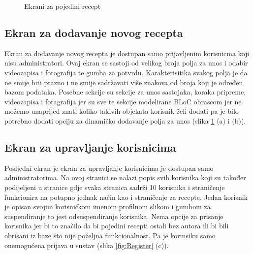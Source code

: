 \documentclass[times, utf8, zavrsni]{fer}
\begin{document}
\begin{figure}[h]
      \caption{Ekrani za pojedini recept}
      \label{fig:Single recipe}
\end{figure}

\subsection{Ekran za dodavanje novog recepta}
Ekran za dodavanje novog recepta je dostupan samo prijavljenim korisnicma koji nisu administratori.
Ovaj ekran se sastoji od velikog broja polja za unos i odabir videozapisa i fotografija te gumba za potvrdu.
Karakterisitika svakog polja je da ne smije biti prazno i ne smije sadržavati više znakova od broja koji
je određen bazom podataka. Posebne sekcije su sekcije za unos sastojaka, koraka pripreme, videozapisa i
fotagrafija jer su sve te sekcije modelirane BLoC obrascom jer ne možemo unaprijed znati koliko
takivih objekata korisnik želi dodati pa je bilo potrebno dodati opciju za dinamičko dodavanje
polja za unos (slika \ref{fig:Single recipe} (a) i (b)).

\subsection{Ekran za upravljanje korisnicima}
Posljedni ekran je ekran za upravljanje korisnicima je dostupan samo administratorima. Na ovoj stranici se
nalazi popis svih korisnika koji su također podijeljeni u stranice gdje svaka stranica sadrži 10 korisnika
i straničenje funkcionira na potupno jednak način kao i straničenje za recepte.
Jedan korisnik je opisan svojim korisničkom imenom profilnom slikom i gumbom za suspendiranje to jest
odsuspendiranje korisnika. Nema opcije za prisanje korisnika jer bi to značilo da bi pojedini recepti
ostali bez autora ili bi bili obrisani iz baze što nije poželjna funkcionalnost. Pa je korinsiku
samo onemogućena prijava u sustav (slika \ref{fig:Register} (c)).
\end{document}
